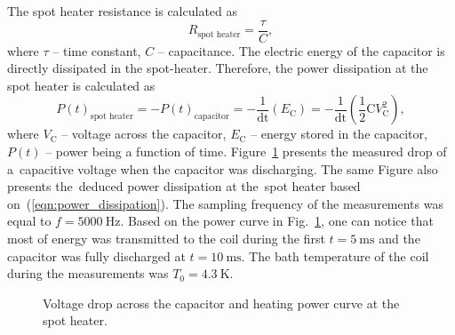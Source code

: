 The spot heater resistance is calculated as
\begin{equation}
    R_\text{spot heater} = \frac{\tau}{C},
\end{equation}
where $\tau$ -- time constant, $C$ -- capacitance. The electric energy of the capacitor is directly dissipated in the spot-heater. Therefore, the power dissipation at the spot heater is calculated as
\begin{equation}
    P(t)_\text{spot heater} = -P(t)_\text{capacitor} = -\frac{1}{\text{dt}} (E_\text{C}) = -\frac{1}{\text{dt}} (\frac{1}{2} \text{C}V_\text{C}^2),
    \label{eqn:power_dissipation}
\end{equation}
where $V_\text{C}$ -- voltage across the capacitor, $E_\text{C}$ -- energy stored in the capacitor, $P(t)$ -- power being a function of time. Figure~\ref{fig:capacitor_discharge} presents the measured drop of a~capacitive voltage when the capacitor was discharging. The same Figure also presents the~deduced power dissipation at the~spot heater based on~(\ref{eqn:power_dissipation}). The sampling frequency of the measurements was equal to $f=5000~\text{Hz}$. Based on the power curve in Fig.~\ref{fig:capacitor_discharge}, one can notice that most of energy was transmitted to the coil during the first $t=5~\text{ms}$ and the capacitor was fully discharged at $t=10~\text{ms}$. The bath temperature of the coil during the measurements was $T_0=4.3~\text{K}$.

\begin{figure}[H]
\centering
{}
\caption{Voltage drop across the capacitor and heating power curve at the spot heater.}
\label{fig:capacitor_discharge}
\end{figure}

